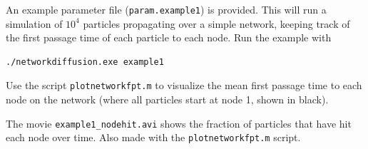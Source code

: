 \documentclass[12pt]{article}
\begin{document}
\begin{minipage}{0.8\textwidth}
An example parameter file (\verb=param.example1=) is provided. This will run a simulation of $10^4$ particles propagating over a simple network, keeping track of the first passage time of each particle to each node. Run the example with 
\begin{verbatim}
./networkdiffusion.exe example1
\end{verbatim}

Use the script \verb=plotnetworkfpt.m= to visualize the mean first passage time to each node on the network (where all particles start at node 1, shown in black).

The movie \verb=example1_nodehit.avi= shows the fraction of particles that have hit each node over time. Also made with the \verb=plotnetworkfpt.m= script. 
\end{minipage}
\end{document}
